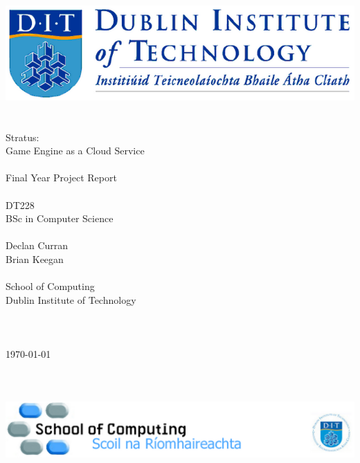 \documentclass[a4paper, 12pt]{report}
\begin{document}
\begin{titlingpage}
	\centering
	\includegraphics[scale=0.5]{titleheader}\\
	~\\
	~\\
	\huge
	Stratus:\\
	Game Engine as a Cloud Service\\
	~\\
	Final Year Project Report\\
	~\\
	\LARGE
	DT228\\
	BSc in Computer Science\\
	~\\
	\large
	Declan Curran\\
	\normalsize
	Brian Keegan\\
	~\\
	School of Computing\\
	Dublin Institute of Technology\\
	~\\
	~\\
	~\\
	\today
	~\\
	~\\
	~\\
	~\\
	\includegraphics[scale=0.5]{titlefooter}
\end{titlingpage}




\setcounter{tocdepth}{2}
\tableofcontents
\listoftables
\listoffigures
\newpage










{}

\newpage

\begin{appendices}
	
\end{appendices}
\end{document}

